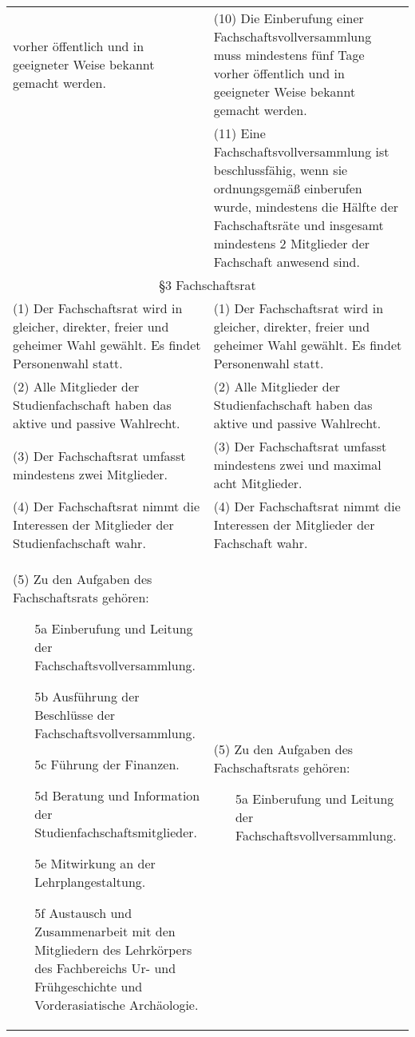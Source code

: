 {\begin{longtable}{|p{7.5cm}|p{7.5cm}|}
        vorher öffentlich und in geeigneter Weise bekannt gemacht werden.&
        (10) Die Einberufung einer Fachschaftsvollversammlung muss mindestens fünf Tage
        vorher öffentlich und in geeigneter Weise bekannt gemacht werden.\\
        &(11) Eine Fachschaftsvollversammlung ist beschlussfähig, wenn sie ordnungsgemäß
        einberufen wurde, mindestens die Hälfte der Fachschaftsräte und insgesamt mindestens
        2 Mitglieder der Fachschaft anwesend sind.\\
        \multicolumn{2}{|c|}{§3 Fachschaftsrat}\\\hline
        (1)  Der Fachschaftsrat wird in gleicher, direkter, freier und geheimer Wahl gewählt.
        Es findet Personenwahl statt.&(1)  Der Fachschaftsrat wird in gleicher, direkter, freier und geheimer Wahl gewählt.
        Es findet Personenwahl statt.\\
        (2)  Alle Mitglieder der Studienfachschaft haben das aktive und passive Wahlrecht.&(2)  Alle Mitglieder der Studienfachschaft haben das aktive und passive Wahlrecht.\\
        (3)  Der Fachschaftsrat umfasst mindestens zwei Mitglieder.&(3)  Der Fachschaftsrat umfasst mindestens zwei und maximal acht Mitglieder.\\
        (4)  Der Fachschaftsrat nimmt die Interessen der Mitglieder der Studienfachschaft wahr. & (4)  Der Fachschaftsrat nimmt die Interessen der Mitglieder der Fachschaft wahr.\\
        (5)  Zu den Aufgaben des Fachschaftsrats gehören:
        \begin{itemize}
        \item[5a]Einberufung und Leitung der Fachschaftsvollversammlung.
        \item[5b]Ausführung der Beschlüsse der Fachschaftsvollversammlung.
        \item[5c]Führung der Finanzen.
        \item[5d]Beratung und Information der Studienfachschaftsmitglieder.
        \item[5e]Mitwirkung an der Lehrplangestaltung.
        \item[5f]Austausch und Zusammenarbeit mit den Mitgliedern des Lehrkörpers des Fachbereichs Ur- und Frühgeschichte und Vorderasiatische Archäologie.    
        \end{itemize}&
        (5)  Zu den Aufgaben des Fachschaftsrats gehören:
        \begin{itemize}
        \item[5a]Einberufung und Leitung der Fachschaftsvollversammlung.

\end{itemize}
\end{longtable}}

